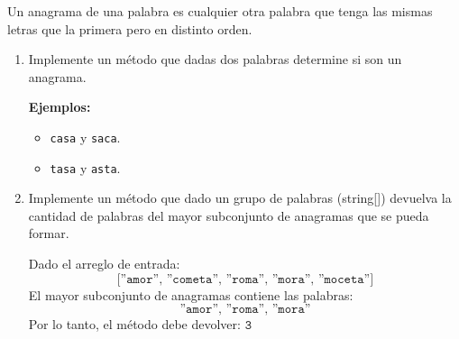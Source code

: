 Un anagrama de una palabra es cualquier otra palabra que tenga las mismas letras que la primera pero en distinto orden.

\begin{enumerate}
    \item Implemente un método que dadas dos palabras determine si son un anagrama.

    \textbf{Ejemplos:}
    \begin{itemize}
    \item \texttt{casa} y \texttt{saca}.
    \item \texttt{tasa} y \texttt{asta}.
    \end{itemize}

    \item Implemente un método que dado un grupo de palabras (string[]) devuelva la cantidad de palabras del mayor subconjunto de anagramas que se pueda formar.

    Dado el arreglo de entrada:
    \[
    \texttt{[''amor'', ''cometa'', ''roma'', ''mora'', ''moceta'']}
    \]
    El mayor subconjunto de anagramas contiene las palabras:
    \[
    \texttt{''amor'', ''roma'', ''mora''}
    \]
    Por lo tanto, el método debe devolver: \( \texttt{3} \)
\end{enumerate}